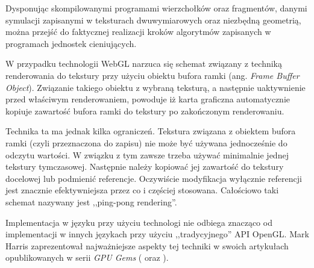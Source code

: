 Dysponując skompilowanymi programami wierzchołków oraz fragmentów, danymi
symulacji zapisanymi w teksturach dwuwymiarowych oraz niezbędną geometrią,
można przejść do faktycznej realizacji kroków algorytmów
zapisanych w programach jednostek cieniujących.

W przypadku technologii WebGL narzuca się schemat związany z techniką
renderowania do tekstury przy użyciu obiektu bufora ramki (ang. \emph{Frame
Buffer Object}). Związanie takiego obiektu z wybraną teksturą, a następnie
uaktywnienie przed właściwym renderowaniem, powoduje iż karta graficzna
automatycznie kopiuje zawartość bufora ramki do tekstury po zakończonym
renderowaniu.

Technika ta ma jednak kilka ograniczeń. Tekstura związana z obiektem bufora
ramki (czyli przeznaczona do zapisu) nie może być używana jednocześnie do
odczytu wartości. W związku z tym zawsze trzeba używać minimalnie jednej
tekstury tymczasowej. Następnie należy kopiować jej zawartość do tekstury
docelowej lub podmienić referencje. Oczywiście modyfikacja wyłącznie
referencji  jest znacznie efektywniejsza przez co i częściej stosowana.
Całościowo taki schemat nazywany jest ,,ping-pong rendering''.

Implementacja w języku  przy użyciu technologi  nie
odbiega znacząco od implementacji w innych językach przy użyciu
,,tradycyjnego'' API OpenGL. Mark Harris zaprezentował najważniejsze aspekty
tej techniki w swoich artykułach opublikowanych w serii \emph{GPU Gems}
(\cite{GPUConcepts} oraz \cite{GPUFluid}).
